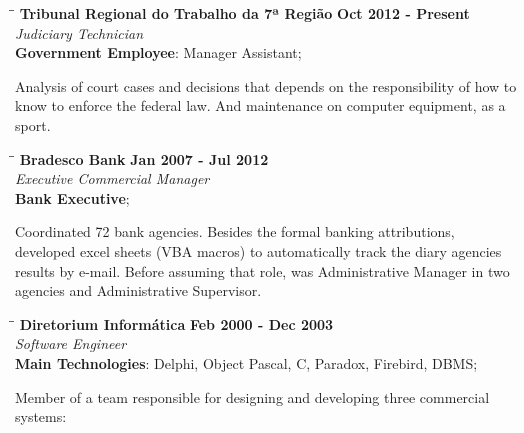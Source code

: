 \documentclass[margin]{res}
\begin{document}
\begin{resume}
\begin{tabbing}
  \hspace{2.3in}\= \hspace{1.7in}\= \kill %
  \textbf{Tribunal Regional do Trabalho da 7ª Região}    \>\>\textbf{Oct 2012 - Present}\\
  \textit{Judiciary Technician}\\
  \textbf{Government Employee}: Manager Assistant;
\end{tabbing}\vspace{-20pt}      %
\vspace{2mm} Analysis of court cases and decisions that depends on the
responsibility of how to know to enforce the federal law.  And maintenance on
computer equipment, as a sport.

\begin{tabbing}
  \hspace{2.3in}\= \hspace{1.7in}\= \kill %
  \textbf{Bradesco Bank}    \>\>\textbf{Jan 2007 - Jul 2012}\\
  \textit{Executive Commercial Manager}\\
  \textbf{Bank Executive};
\end{tabbing}\vspace{-20pt}      %
\vspace{2mm} Coordinated 72 bank agencies. Besides the formal banking
attributions, developed excel sheets (VBA macros) to automatically track the
diary agencies results by e-mail. Before assuming that role, was Administrative
Manager in two agencies and Administrative Supervisor.

\begin{tabbing}
  \hspace{2.3in}\= \hspace{1.7in}\= \kill %
  \textbf{Diretorium Informática}    \>\>\textbf{Feb 2000 - Dec 2003}\\
  \textit{Software Engineer}\\
  \textbf{Main Technologies}: Delphi, Object Pascal, C, Paradox, Firebird,
  DBMS;
\end{tabbing}\vspace{-20pt}      %
\vspace{2mm}

Member of a team responsible for designing and developing three commercial
systems:


\end{resume}
\end{document}
